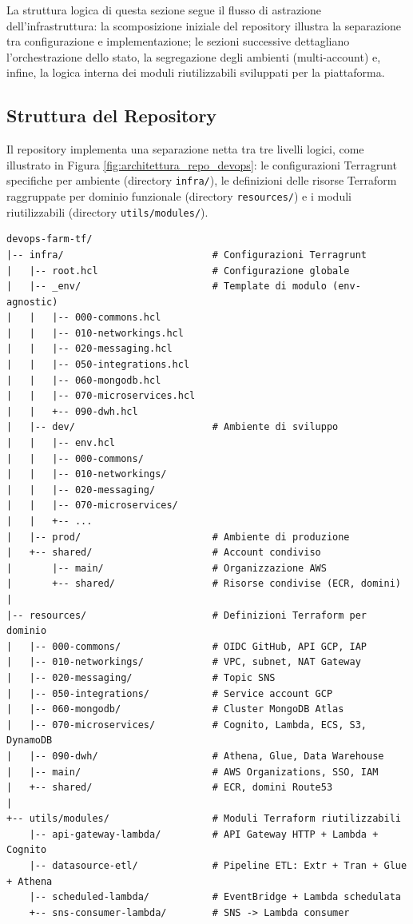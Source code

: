 La struttura logica di questa sezione segue il flusso di astrazione dell'infrastruttura: la scomposizione iniziale del repository illustra la separazione tra configurazione e implementazione; le sezioni successive dettagliano l'orchestrazione dello stato, la segregazione degli ambienti (multi-account) e, infine, la logica interna dei moduli riutilizzabili sviluppati per la piattaforma.

\subsection{Struttura del Repository}

Il repository implementa una separazione netta tra tre livelli logici, come illustrato in Figura \ref{fig:architettura_repo_devops}: le configurazioni Terragrunt specifiche per ambiente (directory \texttt{infra/}), le definizioni delle risorse Terraform raggruppate per dominio funzionale (directory \texttt{resources/}) e i moduli riutilizzabili (directory \texttt{utils/modules/}).

\begin{lstlisting}[basicstyle=\ttfamily\small, breaklines=true, columns=fullflexible]
devops-farm-tf/
|-- infra/                          # Configurazioni Terragrunt
|   |-- root.hcl                    # Configurazione globale
|   |-- _env/                       # Template di modulo (env-agnostic)
|   |   |-- 000-commons.hcl
|   |   |-- 010-networkings.hcl
|   |   |-- 020-messaging.hcl
|   |   |-- 050-integrations.hcl
|   |   |-- 060-mongodb.hcl
|   |   |-- 070-microservices.hcl
|   |   +-- 090-dwh.hcl
|   |-- dev/                        # Ambiente di sviluppo
|   |   |-- env.hcl
|   |   |-- 000-commons/
|   |   |-- 010-networkings/
|   |   |-- 020-messaging/
|   |   |-- 070-microservices/
|   |   +-- ...
|   |-- prod/                       # Ambiente di produzione
|   +-- shared/                     # Account condiviso
|       |-- main/                   # Organizzazione AWS
|       +-- shared/                 # Risorse condivise (ECR, domini)
|
|-- resources/                      # Definizioni Terraform per dominio
|   |-- 000-commons/                # OIDC GitHub, API GCP, IAP
|   |-- 010-networkings/            # VPC, subnet, NAT Gateway
|   |-- 020-messaging/              # Topic SNS
|   |-- 050-integrations/           # Service account GCP
|   |-- 060-mongodb/                # Cluster MongoDB Atlas
|   |-- 070-microservices/          # Cognito, Lambda, ECS, S3, DynamoDB
|   |-- 090-dwh/                    # Athena, Glue, Data Warehouse
|   |-- main/                       # AWS Organizations, SSO, IAM
|   +-- shared/                     # ECR, domini Route53
|
+-- utils/modules/                  # Moduli Terraform riutilizzabili
    |-- api-gateway-lambda/         # API Gateway HTTP + Lambda + Cognito
    |-- datasource-etl/             # Pipeline ETL: Extr + Tran + Glue + Athena
    |-- scheduled-lambda/           # EventBridge + Lambda schedulata
    +-- sns-consumer-lambda/        # SNS -> Lambda consumer
\end{lstlisting}

